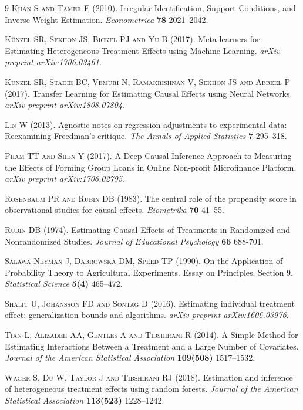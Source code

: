 \documentclass[11pt,paper=letter]{scrartcl}
\begin{document}
\begin{thebibliography}{9}
\textsc{Khan S and Tamer E} (2010).
Irregular Identification, Support Conditions, and Inverse Weight Estimation.
\textit{Econometrica}
\textbf{78} 2021--2042.


\textsc{K{\"u}nzel SR, Sekhon JS, Bickel PJ and Yu B} (2017).
Meta-learners for Estimating Heterogeneous Treatment Effects using Machine Learning.
\textit{arXiv preprint arXiv:1706.03461}.


\textsc{K\"unzel SR, Stadie BC, Vemuri N, Ramakrishnan V, Sekhon JS and Abbeel P} (2017).
Transfer Learning for Estimating Causal Effects using Neural Networks.
\textit{arXiv preprint arXiv:1808.07804}.


\textsc{Lin W} (2013).
Agnostic notes on regression adjustments to experimental data: Reexamining Freedman's critique.
\textit{The Annals of Applied Statistics}
\textbf{7} 295--318.


\textsc{Pham TT and Shen Y} (2017).
A Deep Causal Inference Approach to Measuring the Effects of Forming Group Loans in Online Non-profit Microfinance Platform.
\textit{arXiv preprint arXiv:1706.02795}.


\textsc{Rosenbaum PR and Rubin DB} (1983).
The central role of the propensity score in observational studies for causal effects.
\textit{Biometrika}
\textbf{70} 41--55.


\textsc{Rubin DB} (1974).
Estimating Causal Effects of Treatments in Randomized and Nonrandomized Studies.
\textit{Journal of Educational Psychology}
\textbf{66} 688-701.


\textsc{Salawa-Neyman J, Dabrowska DM, Speed TP} (1990).
On the Application of Probability Theory to Agricultural Experiments. Essay on Principles. Section 9.
\textit{Statistical Science}
\textbf{5(4)} 465--472.


\textsc{Shalit U, Johansson FD and Sontag D} (2016).
Estimating individual treatment effect: generalization bounds and algorithms.
\textit{arXiv preprint arXiv:1606.03976}.


\textsc{Tian L, Alizadeh AA, Gentles A and Tibshirani R} (2014).
A Simple Method for Estimating Interactions Between a Treatment and a Large Number of Covariates.
\textit{Journal of the American Statistical Association}
\textbf{109(508)} 1517--1532.



\textsc{Wager S, Du W, Taylor J and Tibshirani RJ} (2018).
Estimation and inference of heterogeneous treatment effects using random forests.
\textit{Journal of the American Statistical Association}
\textbf{113(523)} 1228--1242.



\end{thebibliography}
\end{document}
